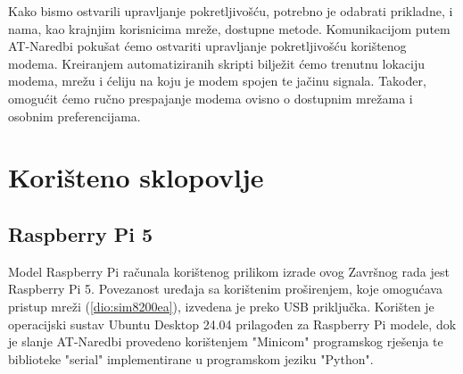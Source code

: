 \documentclass[zavrsnirad]{fer}
\begin{document}
Kako bismo ostvarili upravljanje pokretljivošću, potrebno je odabrati prikladne, i nama, 
kao krajnjim korisnicima mreže, dostupne metode.
Komunikacijom putem AT-Naredbi pokušat ćemo ostvariti upravljanje pokretljivošću korištenog modema.
Kreiranjem automatiziranih skripti bilježit ćemo trenutnu lokaciju modema, mrežu i ćeliju na koju je modem spojen te
jačinu signala. Također, omogućit ćemo ručno prespajanje modema ovisno o dostupnim mrežama
i osobnim preferencijama.







\chapter{Korišteno sklopovlje}
\label{pog:koristeno_sklopovlje}

\section{Raspberry Pi 5}

Model Raspberry Pi računala korištenog prilikom izrade ovog Završnog rada jest Raspberry Pi 5.
Povezanost uređaja sa korištenim proširenjem, koje omogućava pristup mreži (\ref{dio:sim8200ea}),
izvedena je preko USB priključka.
Korišten je operacijski sustav Ubuntu Desktop 24.04 prilagođen za Raspberry Pi modele, dok je
slanje AT-Naredbi provedeno korištenjem "Minicom" programskog rješenja te biblioteke "serial" implementirane u programskom
jeziku "Python".
\end{document}
